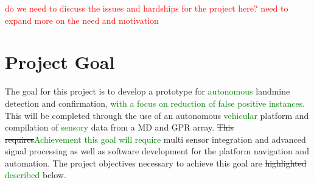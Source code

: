 \documentclass[main.tex]{subfiles}
\begin{document}

\textcolor{red}{do we need to discuss the issues and hardships for the project here?}
\textcolor{red}{need to expand more on the need and motivation}
\\\par



\section{Project Goal}

The goal for this project is to develop a prototype for \textcolor{green}{autonomous} landmine detection and confirmation\textcolor{green}{, with a focus on reduction of false positive instances}. This will be completed through the use of an autonomous \textcolor{green}{vehicular} platform and compilation of \textcolor{green}{sensory} data from a MD and GPR array. \sout{This requires}\textcolor{green}{Achievement this goal will require} multi sensor integration and advanced signal processing as well as software development for the platform navigation and automation. The project objectives necessary to achieve this goal are \sout{highlighted} \textcolor{green}{described} below. 




 
\end{document}
